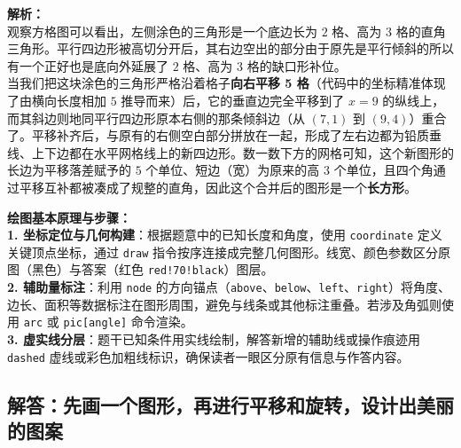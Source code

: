 \vspace{0.6cm}
{\small\color{gray}
\textbf{解析：}\\
观察方格图可以看出，左侧涂色的三角形是一个底边长为 $2$ 格、高为 $3$ 格的直角三角形。平行四边形被高切分开后，其右边空出的部分由于原先是平行倾斜的所以有一个正好也是底向外延展了 $2$ 格、高为 $3$ 格的缺口形补位。\\
当我们把这块涂色的三角形严格沿着格子\textbf{向右平移 5 格}（代码中的坐标精准体现了由横向长度相加 $5$ 推导而来）后，它的垂直边完全平移到了 $x=9$ 的纵线上，而其斜边则地同平行四边形原本右侧的那条倾斜边（从 $(7,1)$ 到 $(9,4)$）重合了。平移补齐后，与原有的右侧空白部分拼放在一起，形成了左右边都为铅质垂线、上下边都在水平网格线上的新四边形。数一数下方的网格可知，这个新图形的长边为平移落差赋予的 $5$ 个单位、短边（宽）为原来的高 $3$ 个单位，且四个角通过平移互补都被凑成了规整的直角，因此这个合并后的图形是一个\textbf{长方形}。
}


\vspace{0.6cm}

{\small\color{blue!70!black}
\textbf{绘图基本原理与步骤：}\\
\textbf{1. 坐标定位与几何构建}：根据题意中的已知长度和角度，使用 \texttt{coordinate} 定义关键顶点坐标，通过 \texttt{draw} 指令按序连接成完整几何图形。线宽、颜色参数区分原图（黑色）与答案（红色 \texttt{red!70!black}）图层。\\
\textbf{2. 辅助量标注}：利用 \texttt{node} 的方向锚点（\texttt{above}、\texttt{below}、\texttt{left}、\texttt{right}）将角度、边长、面积等数据标注在图形周围，避免与线条或其他标注重叠。若涉及角弧则使用 \texttt{arc} 或 \texttt{pic[angle]} 命令渲染。\\
\textbf{3. 虚实线分层}：题干已知条件用实线绘制，解答新增的辅助线或操作痕迹用 \texttt{dashed} 虚线或彩色加粗线标识，确保读者一眼区分原有信息与作答内容。
}

\newpage

\newpage

\subsection{解答：先画一个图形，再进行平移和旋转，设计出美丽的图案}

\vspace{0.6cm}

